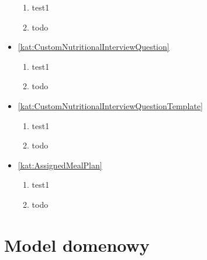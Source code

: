 \begin{itemize}[label={\textbf{Ograniczenia dla}}, wide, labelwidth=!, labelindent=0pt]
\begin{enumerate}[label={\textbf{OGR/\protect\threedigits{\arabic{enumi}}}}, wide, labelwidth=!, align=left, leftmargin=3cm, resume]
        \item test1

        \item todo
    \end{enumerate}
    \item\ref{kat:CustomNutritionalInterviewQuestion}
    \begin{enumerate}[label={\textbf{OGR/\protect\threedigits{\arabic{enumi}}}}, wide, labelwidth=!, align=left, leftmargin=3cm, resume]

        \item test1

        \item todo
    \end{enumerate}
    \item\ref{kat:CustomNutritionalInterviewQuestionTemplate}
    \begin{enumerate}[label={\textbf{OGR/\protect\threedigits{\arabic{enumi}}}}, wide, labelwidth=!, align=left, leftmargin=3cm, resume]

        \item test1

        \item todo
    \end{enumerate}
    \item\ref{kat:AssignedMealPlan}
    \begin{enumerate}[label={\textbf{OGR/\protect\threedigits{\arabic{enumi}}}}, wide, labelwidth=!, align=left, leftmargin=3cm, resume]

        \item test1

        \item todo
    \end{enumerate}
\end{itemize}

\section{Model domenowy}

